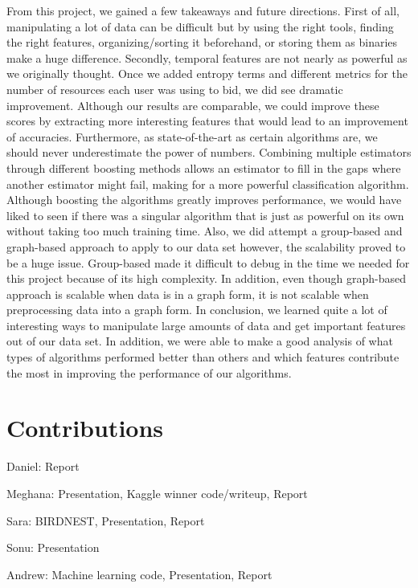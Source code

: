 \documentclass{article} %
\begin{document}
From this project, we gained a few takeaways and future directions. First of all, manipulating a lot of data can be difficult but by using the right tools, finding the right features, organizing/sorting it beforehand, or storing them as binaries make a huge difference. Secondly, temporal features are not nearly as powerful as we originally thought. Once we added entropy terms and different metrics for the number of resources each user was using to bid, we did see dramatic improvement. Although our results are comparable, we could improve these scores by extracting more interesting features that would lead to an improvement of accuracies. Furthermore, as state-of-the-art as certain algorithms are, we should never underestimate the power of numbers. Combining multiple estimators through different boosting methods allows an estimator to fill in the gaps where another estimator might fail, making for a more powerful classification algorithm. Although boosting the algorithms greatly improves performance, we would have liked to seen if there was a singular algorithm that is just as powerful on its own without taking too much training time. Also, we did attempt a group-based and graph-based approach to apply to our data set however, the scalability proved to be a huge issue. Group-based made it difficult to debug in the time we needed for this project because of its high complexity. In addition, even though graph-based approach is scalable when data is in a graph form, it is not scalable when preprocessing data into a graph form. In conclusion, we learned quite a lot of interesting ways to manipulate large amounts of data and get important features out of our data set. In addition, we were able to make a good analysis of what types of algorithms performed better than others and which features contribute the most in improving the performance of our algorithms.

\section{Contributions}

Daniel: Report

Meghana: Presentation, Kaggle winner code/writeup, Report

Sara: BIRDNEST, Presentation, Report

Sonu: Presentation

Andrew: Machine learning code, Presentation, Report
\end{document}
